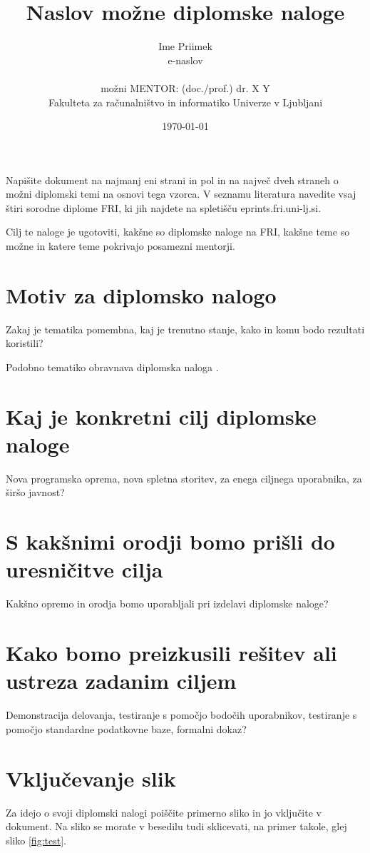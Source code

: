 \documentclass[11pt,a4paper]{article}
\title{Naslov možne diplomske naloge}
\author{Ime Priimek\\
e-naslov\\
\ \\
možni MENTOR: (doc./prof.) dr. X Y \\
Fakulteta za računalništvo in informatiko Univerze v Ljubljani
\date{\today}         
}
\begin{document}
\maketitle

Napišite dokument na najmanj eni strani in pol in na največ dveh straneh o možni diplomski temi na osnovi tega vzorca.
V seznamu literatura navedite vsaj štiri sorodne diplome FRI, ki jih najdete na spletišču eprints.fri.uni-lj.si.

Cilj te naloge je ugotoviti, kakšne so diplomske naloge na FRI, kakšne teme so možne in  katere teme pokrivajo posamezni mentorji.


\section{Motiv za diplomsko nalogo}

Zakaj je tematika pomembna, kaj je trenutno stanje, kako in komu bodo rezultati koristili?

Podobno tematiko obravnava diplomska naloga \cite{diploma1}.


\section{Kaj je konkretni cilj diplomske naloge}

Nova programska oprema, nova spletna storitev, za enega ciljnega uporabnika, za širšo javnost?


\section{S kakšnimi orodji bomo prišli do uresničitve cilja}

Kakšno opremo in orodja bomo uporabljali pri izdelavi diplomske naloge?


\section{Kako bomo preizkusili rešitev ali ustreza zadanim ciljem}

Demonstracija delovanja, testiranje s pomočjo bodočih uporabnikov, testiranje s pomočjo standardne podatkovne baze, formalni dokaz?


\section{Vključevanje slik}

Za idejo o svoji diplomski nalogi poiščite primerno sliko in jo vključite v dokument.
Na sliko se morate v besedilu tudi sklicevati, na primer takole, glej sliko \ref{fig:test}.
\end{document}
